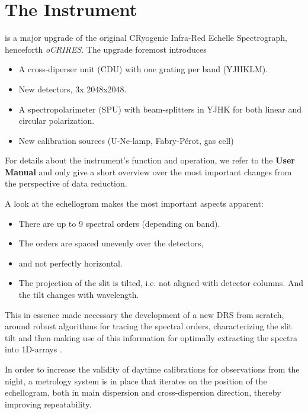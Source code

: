 \section{The Instrument}
\label{sec:instrument}

\instrument{} is a major upgrade of the original CRyogenic Infra-Red Echelle
Spectrograph, henceforth \textit{oCRIRES}. The upgrade foremost introduces
\begin{itemize}
  \item A cross-diperser unit (CDU) with one grating per band (YJHKLM).
  \item New detectors, 3x 2048x2048.
  \item A spectropolarimeter (SPU) with beam-splitters in YJHK for both linear
        and circular polarization.
  \item New calibration sources (U-Ne-lamp, Fabry-Pérot, gas cell)
\end{itemize}

For details about the instrument's function and operation, we refer to the
\textbf{User Manual} \cite{CIRESMAN} and only give a short overview over the
most important changes from the perspective of data reduction.

A look at the echellogram makes the most important aspects apparent:

\begin{itemize}
  \item There are up to 9 spectral orders (depending on band).
  \item The orders are spaced unevenly over the detectors,
  \item and not perfectly horizontal.
  \item The projection of the slit is tilted, i.e. not aligned with detector
    columns. And the tilt changes with wavelength.
\end{itemize}

This in essence made necessary the development of a new DRS from scratch, around
robust algorithms for tracing the spectral orders, characterizing the slit tilt
and then making use of this information for optimally extracting the spectra
into 1D-arrays \cite{2021A&A...646A..32P}.

In order to increase the validity of daytime calibrations for observations from
the night, a metrology system is in place that iterates on the position of the
echellogram, both in main dispersion and cross-dispersion direction, thereby
improving repeatability.


